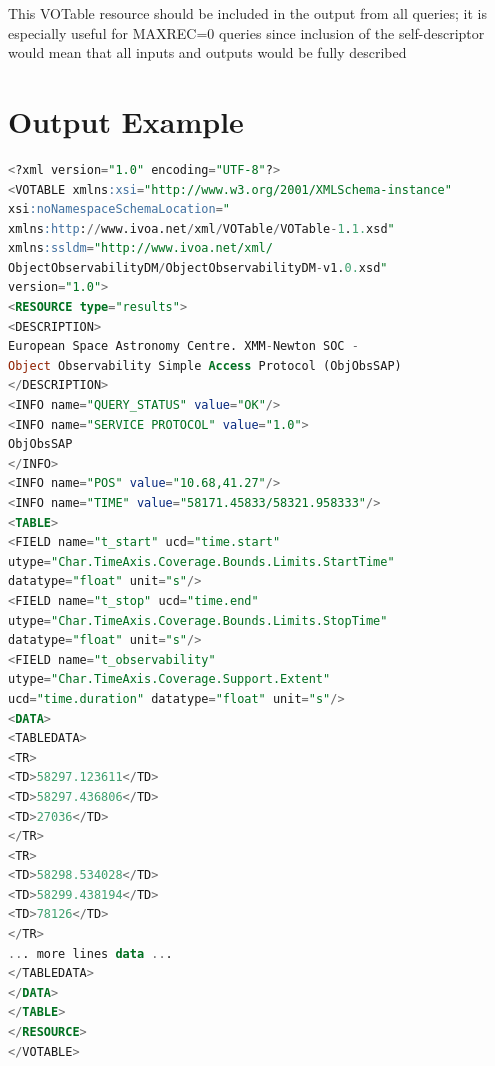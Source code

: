 \documentclass[11pt,a4paper]{ivoatex/ivoa}
\begin{document}
This VOTable resource should be included in the output from all queries;
it is especially useful for MAXREC=0 queries since inclusion of the
self-descriptor would mean that all inputs and outputs would be fully
described

\section{Output Example}
\begin{lstlisting}[language=SQL]
<?xml version="1.0" encoding="UTF-8"?>
<VOTABLE xmlns:xsi="http://www.w3.org/2001/XMLSchema-instance"
xsi:noNamespaceSchemaLocation="
xmlns:http://www.ivoa.net/xml/VOTable/VOTable-1.1.xsd"
xmlns:ssldm="http://www.ivoa.net/xml/
ObjectObservabilityDM/ObjectObservabilityDM-v1.0.xsd"
version="1.0">
<RESOURCE type="results">
<DESCRIPTION>
European Space Astronomy Centre. XMM-Newton SOC -
Object Observability Simple Access Protocol (ObjObsSAP)
</DESCRIPTION>
<INFO name="QUERY_STATUS" value="OK"/>
<INFO name="SERVICE PROTOCOL" value="1.0">
ObjObsSAP
</INFO>
<INFO name="POS" value="10.68,41.27"/>
<INFO name="TIME" value="58171.45833/58321.958333"/>
<TABLE>
<FIELD name="t_start" ucd="time.start"
utype="Char.TimeAxis.Coverage.Bounds.Limits.StartTime"
datatype="float" unit="s"/>
<FIELD name="t_stop" ucd="time.end"
utype="Char.TimeAxis.Coverage.Bounds.Limits.StopTime"
datatype="float" unit="s"/>
<FIELD name="t_observability"
utype="Char.TimeAxis.Coverage.Support.Extent"
ucd="time.duration" datatype="float" unit="s"/>
<DATA>
<TABLEDATA>
<TR>
<TD>58297.123611</TD>
<TD>58297.436806</TD>
<TD>27036</TD>
</TR>
<TR>
<TD>58298.534028</TD>
<TD>58299.438194</TD>
<TD>78126</TD>
</TR>
... more lines data ...
</TABLEDATA>
</DATA>
</TABLE>
</RESOURCE>
</VOTABLE>
\end{lstlisting}

\appendix
\renewcommand{\thesection}{\Alph{section}.\arabic{section}}
\setcounter{section}{0}
\end{document}

